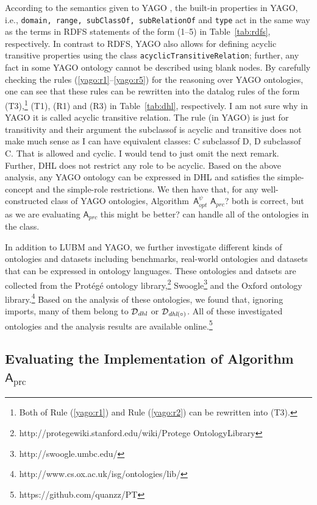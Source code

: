 According to the semantics given to YAGO \cite{SuchanekKW08}, the built-in properties in YAGO,
i.e., \texttt{domain, range, subClassOf, subRelationOf} and \texttt{type} act in the same
way as the terms in RDFS statements of the form (1--5) in Table~\ref{tab:rdfs}, respectively.
In contrast to RDFS, YAGO also allows for defining acyclic 
transitive properties using the
class \texttt{acyclicTransitiveRelation}; further, any fact in some YAGO ontology cannot be
described using blank nodes. By carefully checking the rules (\ref{yago:r1}--\ref{yago:r5}) for the reasoning over YAGO ontologies,
one can see that these rules can be rewritten into the datalog rules
of the form (T3),\footnote{Both of Rule (\ref{yago:r1}) and
Rule (\ref{yago:r2}) can be rewritten into (T3).} (T1), (R1) and (R3) in Table~\ref{tab:dhl}, respectively.
{\color{red}I am not sure why in YAGO it is called acyclic transitive
  relation. The rule (in YAGO) is just for transitivity and their
  argument the subclassof is acyclic and transitive does not make much
sense as I can have equivalent classes: C subclassof D, D subclassof
C. That is allowed and cyclic. I would tend to just omit the next
remark. } Further, DHL does not restrict any role to be acyclic.
Based on the above analysis, any YAGO ontology can be expressed in DHL
and satisfies the simple-concept and the simple-role restrictions. We then have that,
for any well-constructed class of YAGO ontologies,
Algorithm~$\mathsf{A}_{opt}^{\psi}$ {\color{red} $\mathsf{A}_{prc}$?
  both is correct, but as we are evaluating $\mathsf{A}_{prc}$ this
  might be better?}
can handle all of the ontologies in the class.

In addition to LUBM and YAGO, we further investigate different kinds of ontologies and datasets
including benchmarks, real-world ontologies and datasets that can be
expressed in ontology languages.
These ontologies and datsets are collected from the Prot\'{e}g\'{e}
ontology
library,\footnote{http://protegewiki.stanford.edu/wiki/Protege\textunderscore
  Ontology\textunderscore Library}
Swoogle\footnote{http://swoogle.umbc.edu/} and the Oxford ontology library.\footnote{http://www.cs.ox.ac.uk/isg/ontologies/lib/}
Based on the analysis of these ontologies, we found that, ignoring imports, many of them
belong to $\mathcal{D}_{\textit{\text{dhl}}}$ or $\mathcal{D}_{\textit{\text{dhl}}(\circ)}$.
All of these investigated ontologies and the analysis results are available online.\footnote{https://github.com/quanzz/PT}


\subsection{Evaluating the Implementation of Algorithm~$\mathsf{A}_{\text{prc}}$}

